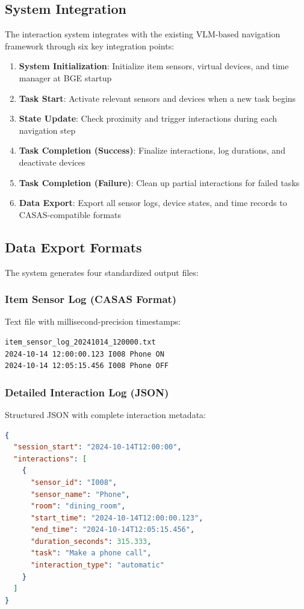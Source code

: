 \documentclass[conference]{IEEEtran}
\begin{document}
\subsection{System Integration}

The interaction system integrates with the existing VLM-based navigation framework through six key integration points:

\begin{enumerate}
    \item \textbf{System Initialization}: Initialize item sensors, virtual devices, and time manager at BGE startup
    \item \textbf{Task Start}: Activate relevant sensors and devices when a new task begins
    \item \textbf{State Update}: Check proximity and trigger interactions during each navigation step
    \item \textbf{Task Completion (Success)}: Finalize interactions, log durations, and deactivate devices
    \item \textbf{Task Completion (Failure)}: Clean up partial interactions for failed tasks
    \item \textbf{Data Export}: Export all sensor logs, device states, and time records to CASAS-compatible formats
\end{enumerate}

\subsection{Data Export Formats}

The system generates four standardized output files:

\subsubsection{Item Sensor Log (CASAS Format)}
Text file with millisecond-precision timestamps:
\begin{lstlisting}[basicstyle=\ttfamily\scriptsize]
item_sensor_log_20241014_120000.txt
2024-10-14 12:00:00.123 I008 Phone ON
2024-10-14 12:05:15.456 I008 Phone OFF
\end{lstlisting}

\subsubsection{Detailed Interaction Log (JSON)}
Structured JSON with complete interaction metadata:
\begin{lstlisting}[language=json,basicstyle=\ttfamily\scriptsize]
{
  "session_start": "2024-10-14T12:00:00",
  "interactions": [
    {
      "sensor_id": "I008",
      "sensor_name": "Phone",
      "room": "dining_room",
      "start_time": "2024-10-14T12:00:00.123",
      "end_time": "2024-10-14T12:05:15.456",
      "duration_seconds": 315.333,
      "task": "Make a phone call",
      "interaction_type": "automatic"
    }
  ]
}
\end{lstlisting}
\end{document}
